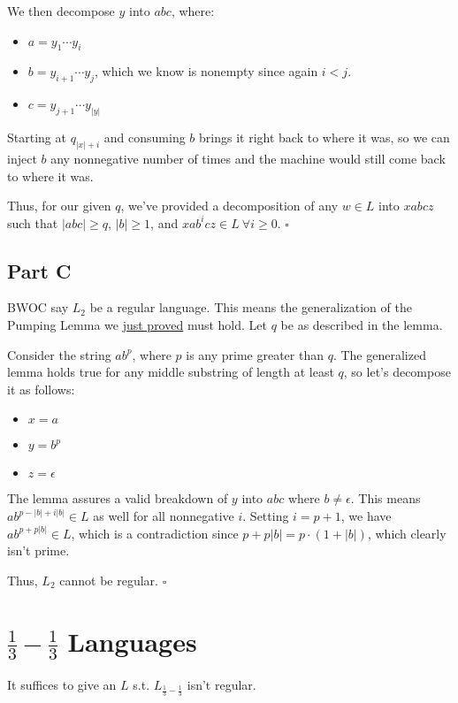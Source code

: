 \documentclass[12pt]{article}
\begin{document}
We then decompose $y$ into $abc$, where:
\begin{itemize}[nolistsep]
    \item $a=y_1 \cdots y_i$
    \item $b=y_{i+1} \cdots y_j$, which we know is nonempty since again $i<j$.
    \item $c=y_{j+1} \cdots y_{|y|}$
\end{itemize}
Starting at $q_{|x|+i}$ and consuming $b$ brings it right back to where it was,
so we can inject $b$ any nonnegative number of times and the machine would still
come back to where it was.

Thus, for our given $q$, we've provided a decomposition of any $w \in L$
into $xabcz$ such that $|abc| \ge q$, $|b| \ge 1$, and $xab^i cz \in L\ \forall i \ge 0$. $\square$

\subsection{Part C}

BWOC say $L_2$ be a regular language.
This means the generalization of the Pumping Lemma we
\hyperref[subsec:generalization]{just proved} must hold.
Let $q$ be as described in the lemma.

Consider the string $ab^p$, where $p$ is any prime greater than $q$.
The generalized lemma holds true for any middle substring of length at least $q$,
so let's decompose it as follows:
\begin{itemize}[nolistsep]
    \item $x=a$
    \item $y=b^p$
    \item $z=\epsilon$
\end{itemize}
The lemma assures a valid breakdown of $y$ into $abc$ where $b \ne \epsilon$.
This means $ab^{p-|b|+i|b|} \in L$ as well for all nonnegative $i$.
Setting $i=p+1$, we have $ab^{p+p|b|} \in L$, which is a contradiction
since $p+p|b|=p \cdot (1+|b|)$, which clearly isn't prime.

Thus, $L_2$ cannot be regular. $\square$

\pagebreak

\section{\texorpdfstring{$\frac{1}{3}-\frac{1}{3}$}{1/3-1/3} Languages}

It suffices to give an $L$ s.t. $L_{\frac{1}{3}-\frac{1}{3}}$ isn't regular.
\end{document}
